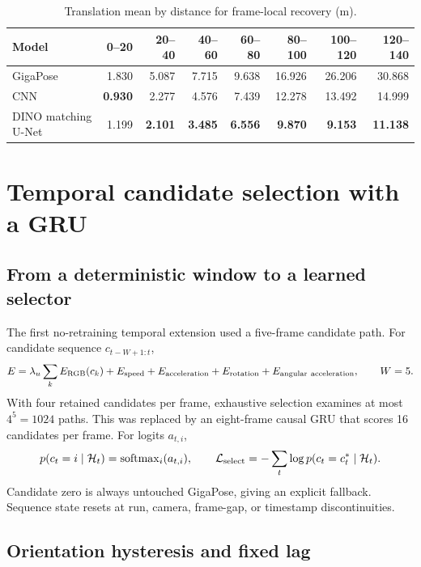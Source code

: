 \documentclass[11pt]{article}
\newcommand{\best}[1]{\textbf{#1}}
\begin{document}
\begin{table}[H]
\centering
\caption{Translation mean by distance for frame-local recovery (m).}
\begin{tabular}{lrrrrrrr}
\toprule
Model & 0--20 & 20--40 & 40--60 & 60--80 & 80--100 & 100--120 & 120--140\\
\midrule
GigaPose & 1.830 & 5.087 & 7.715 & 9.638 & 16.926 & 26.206 & 30.868\\
CNN & \best{0.930} & 2.277 & 4.576 & 7.439 & 12.278 & 13.492 & 14.999\\
DINO matching U-Net & 1.199 & \best{2.101} & \best{3.485} & \best{6.556} & \best{9.870} & \best{9.153} & \best{11.138}\\
\bottomrule
\end{tabular}
\end{table}

\section{Temporal candidate selection with a GRU}

\subsection{From a deterministic window to a learned selector}

The first no-retraining temporal extension used a five-frame candidate path.  For candidate sequence $c_{t-W+1:t}$,
\begin{equation}
E=\lambda_u\sum_k E_{\rm RGB}(c_k)+E_{\rm speed}+E_{\rm acceleration}+E_{\rm rotation}+E_{\rm angular\ acceleration},\qquad W=5.
\end{equation}
With four retained candidates per frame, exhaustive selection examines at most $4^5=1024$ paths.  This was replaced by an eight-frame causal GRU that scores 16 candidates per frame.  For logits $a_{t,i}$,
\begin{equation}
p(c_t=i\mid\mathcal H_t)=\operatorname{softmax}_i(a_{t,i}),\qquad
\mathcal L_{\rm select}=-\sum_t\log p(c_t=c_t^*\mid\mathcal H_t).
\end{equation}
Candidate zero is always untouched GigaPose, giving an explicit fallback.  Sequence state resets at run, camera, frame-gap, or timestamp discontinuities.

\subsection{Orientation hysteresis and fixed lag}
\end{document}
